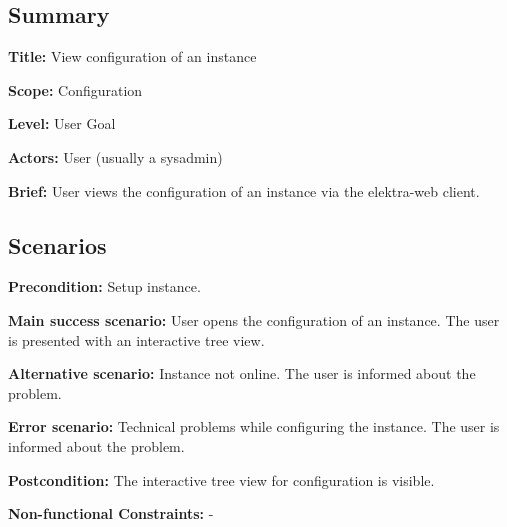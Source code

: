 \subsection*{Summary}


\begin{DoxyItemize}
\item {\bfseries Title\+:} View configuration of an instance
\item {\bfseries Scope\+:} Configuration
\item {\bfseries Level\+:} User Goal
\item {\bfseries Actors\+:} User (usually a sysadmin)
\item {\bfseries Brief\+:} User views the configuration of an instance via the elektra-\/web client.
\end{DoxyItemize}

\subsection*{Scenarios}


\begin{DoxyItemize}
\item {\bfseries Precondition\+:} Setup instance.
\item {\bfseries Main success scenario\+:} User opens the configuration of an instance. The user is presented with an interactive tree view.
\item {\bfseries Alternative scenario\+:} Instance not online. The user is informed about the problem.
\item {\bfseries Error scenario\+:} Technical problems while configuring the instance. The user is informed about the problem.
\item {\bfseries Postcondition\+:} The interactive tree view for configuration is visible.
\item {\bfseries Non-\/functional Constraints\+:} -\/ 
\end{DoxyItemize}